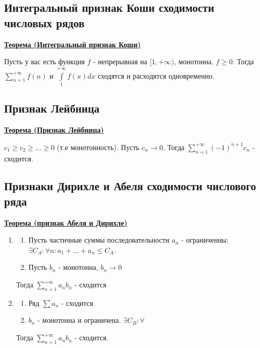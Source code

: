\documentclass{article}
\newcommand{\integral}[2]{\displaystyle\int\limits_{#1}^{#2}}
\newcommand{\thmm}[1]{\underline{\textbf{#1}}}
\begin{document}
\subsection{Интегральный признак Коши сходимости числовых рядов}

\thmm{Теорема (Интегральный признак Коши)}

Пусть у вас есть функция $f$ - непрерывная на $[1,+\infty)$, монотонна, $f\geq 0 $. Тогда $\sum\limits_{n=1}^{+\infty}f(n)$ и $\integral{1}{+\infty}f(x)dx$ сходятся и расходятся одновременно.

\subsection{Признак Лейбница}

\thmm{{Теорема (Признак Лейбница)}}

$c_1 \geq c_2 \geq \ldots \geq 0$ (т.е монотонность). Пусть $c_n \rightarrow 0 $. Тогда $\sum\limits_{n=1}^{+\infty} (-1)^{n+1} c_n$ - сходится.

\subsection{Признаки Дирихле и Абеля сходимости числового ряда}


\thmm{Теорема (признак Абеля и Дирихле)}

\begin{enumerate}
    \item
    \begin{enumerate}
        \item  Пусть частичные суммы последовательности $a_n$ - ограниченны: $\exists C_A: \forall n: a_1 + \ldots + a_n \leq C_A$.
         \item Пусть $b_n$ - монотонна, $b_n\rightarrow 0 $
    
    \end{enumerate}
     Тогда $\sum\limits_{n=1}^{+\infty}a_nb_n$ - сходится
  
   \item
   \begin{enumerate}
       \item Ряд $\sum a_n$ - сходится.
        \item $b_n$ - монотонна и ограничена. $\exists C_B: \forall $
   \end{enumerate}
    Тогда $\sum\limits_{n=1}^{+\infty}a_nb_n$ - сходится.
   
\end{enumerate}
\end{document}
